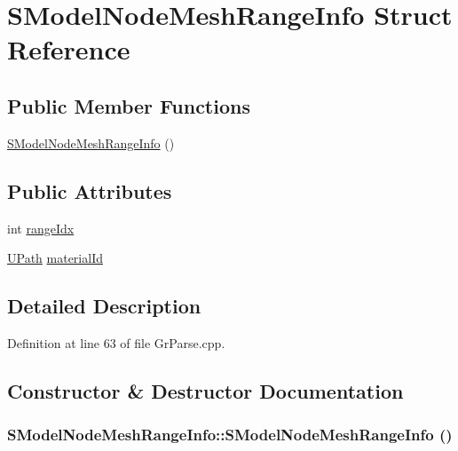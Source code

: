 \hypertarget{struct_s_model_node_mesh_range_info}{
\section{SModelNodeMeshRangeInfo Struct Reference}
\label{struct_s_model_node_mesh_range_info}
}
\subsection*{Public Member Functions}
\begin{CompactItemize}
\item 
\hyperlink{struct_s_model_node_mesh_range_info_882bacf79495a4f89280c6cc5f23b815}{SModelNodeMeshRangeInfo} ()
\end{CompactItemize}
\subsection*{Public Attributes}
\begin{CompactItemize}
\item 
int \hyperlink{struct_s_model_node_mesh_range_info_1d4582bb5a63563bbf20adf986fd6d04}{rangeIdx}
\item 
\hyperlink{class_u_path}{UPath} \hyperlink{struct_s_model_node_mesh_range_info_bf16f26b74ad08b098ef75563a1eae90}{materialId}
\end{CompactItemize}


\subsection{Detailed Description}


Definition at line 63 of file GrParse.cpp.

\subsection{Constructor \& Destructor Documentation}
\hypertarget{struct_s_model_node_mesh_range_info_882bacf79495a4f89280c6cc5f23b815}{
\subsubsection[{SModelNodeMeshRangeInfo}]{\setlength{\rightskip}{0pt plus 5cm}SModelNodeMeshRangeInfo::SModelNodeMeshRangeInfo ()}}
\label{struct_s_model_node_mesh_range_info_882bacf79495a4f89280c6cc5f23b815}




